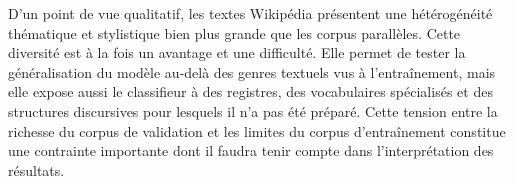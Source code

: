D'un point de vue qualitatif, les textes Wikipédia présentent une hétérogénéité thématique et stylistique
bien plus grande que les corpus parallèles. Cette diversité est à la fois un avantage et une difficulté.
Elle permet de tester la généralisation du modèle au-delà des genres textuels vus à l'entraînement, mais
elle expose aussi le classifieur à des registres, des vocabulaires spécialisés et des structures discursives
pour lesquels il n'a pas été préparé. Cette tension entre la richesse du corpus de validation et les
limites du corpus d'entraînement constitue une contrainte importante dont il faudra tenir
compte dans l'interprétation des résultats.
